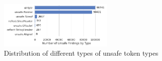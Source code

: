 \begin{figure}[!t]
    \centering
    \includegraphics[width=0.5\textwidth]{gfx/figures/distribution-unsafe-types.png}
    \caption{Distribution of different types of unsafe token types}
    \label{fig:unsafe-tokens-distribution}
\end{figure}